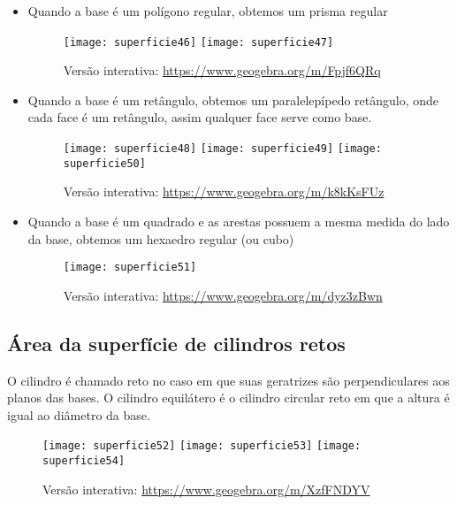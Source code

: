 \begin{itemize}
  \item Quando a base é um polígono regular, obtemos um prisma regular
  \begin{figure}[H]
  \centering

  \texttt{[image: superficie46]}
  \hspace{.5em}
  \texttt{[image: superficie47]}

  \caption{Versão interativa: \url{https://www.geogebra.org/m/Fpjf6QRq}}
  \end{figure}

  \item Quando a base é um retângulo, obtemos um paralelepípedo retângulo, onde cada face é um retângulo, assim qualquer face serve como base.
  \begin{figure}[H]
  \centering

  \texttt{[image: superficie48]}
  \hspace{.5em}
  \texttt{[image: superficie49]}
  \hspace{.5em}
  \texttt{[image: superficie50]}

  \caption{Versão interativa: \url{https://www.geogebra.org/m/k8kKsFUz}}
   \end{figure}

   \item Quando a base é um quadrado e as arestas possuem a mesma medida do lado da base, obtemos um hexaedro regular (ou cubo)

   \begin{figure}[H]
   \centering

   \texttt{[image: superficie51]}


   \caption{Versão interativa: \url{https://www.geogebra.org/m/dyz3zBwn}}
   \end{figure}
\end{itemize}

\subsection{ Área da superfície de cilindros retos}

O cilindro é chamado reto no caso em que suas geratrizes são perpendiculares aos planos das bases. O cilindro equilátero é o cilindro circular reto em que a altura é igual ao diâmetro da base.

\begin{figure}[H]
\centering

\texttt{[image: superficie52]}
\hspace{.5em}
\texttt{[image: superficie53]}
\hspace{.5em}
\texttt{[image: superficie54]}

\caption{Versão interativa: \url{https://www.geogebra.org/m/XzfFNDYV}}
\end{figure}

